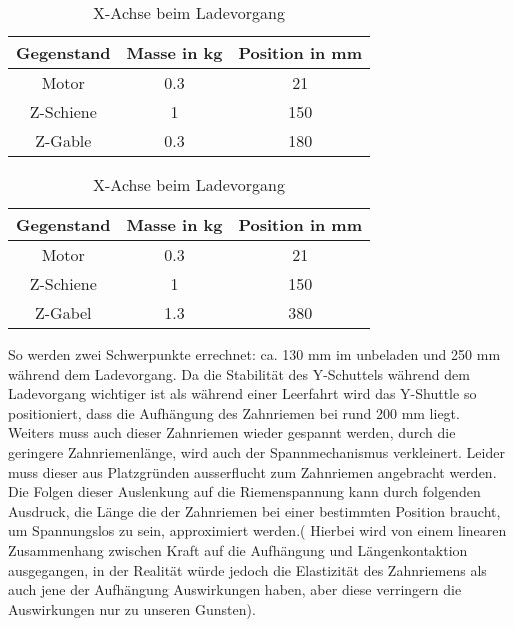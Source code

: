 \begin{table}[H]
    \centering
    \centering
        \begin{tabular}{c c c}
            Gegenstand & Masse in kg & Position in mm\\
            \hline
            Motor & 0.3 & 21 \\
            Z-Schiene & 1 & 150 \\
            Z-Gable & 0.3 & 180 
        \end{tabular}
    \caption{X-Achse unbeladen und eingefahren}
        \vspace{5mm}
        \centering
        \begin{tabular}{c c c}
            Gegenstand & Masse in kg & Position in mm\\ 
            \hline
            Motor & 0.3 & 21 \\
            Z-Schiene & 1 & 150 \\
            Z-Gabel & 1.3 & 380
        \end{tabular}
        \caption{X-Achse beim Ladevorgang}
\end{table}
So werden zwei Schwerpunkte errechnet: ca. 130 mm im unbeladen und 250 mm während dem Ladevorgang. Da die Stabilität des Y-Schuttels während dem Ladevorgang wichtiger ist als während einer Leerfahrt wird das Y-Shuttle so positioniert, dass die Aufhängung des Zahnriemen bei rund 200 mm liegt. \\
Weiters muss auch dieser Zahnriemen wieder gespannt werden, durch die geringere Zahnriemenlänge, wird auch der Spannmechanismus verkleinert.
Leider muss dieser aus Platzgründen ausserflucht zum Zahnriemen angebracht werden. Die Folgen dieser Auslenkung auf die Riemenspannung kann durch folgenden Ausdruck, die Länge die der Zahnriemen bei einer bestimmten Position braucht, um Spannungslos zu sein, approximiert werden.( Hierbei wird von einem linearen Zusammenhang zwischen Kraft auf die Aufhängung und Längenkontaktion ausgegangen, in der Realität würde jedoch die Elastizität des Zahnriemens als auch jene der Aufhängung Auswirkungen haben, aber diese verringern die Auswirkungen nur zu unseren Gunsten).
    
